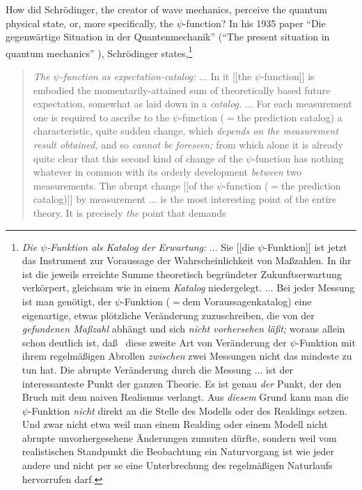 \documentclass [11pt]{llncs}
\begin{document}
\begin{description}
\label{l-schroe}
How did Schr\"odinger, the creator of wave mechanics, perceive
the quantum physical state, or, more specifically,  the
$\psi$-function? In his
1935 paper
``Die gegenw\"artige
Situation in der Quantenmechanik'' (``The present situation in quantum
mechanics''
\cite[p. 823]{schrodinger}), Schr\"odinger states,\footnote{
{\em Die $\psi$-Funktion als Katalog der Erwartung:}
$\ldots$
Sie [[die $\psi$-Funktion]] ist jetzt das Instrument zur Voraussage der
Wahrscheinlichkeit von Ma\ss zahlen. In ihr ist die jeweils erreichte
Summe theoretisch begr\"undeter Zukunftserwartung verk\"orpert,
gleichsam wie in einem {\em Katalog} niedergelegt.
$\ldots$
Bei jeder Messung ist man gen\"otigt, der $\psi$-Funktion ($=$dem
Voraussagenkatalog) eine eigenartige, etwas pl\"otzliche Ver\"anderung
zuzuschreiben, die von der {\em gefundenen Ma\ss zahl} abh\"angt und
sich {\em nicht vorhersehen l\"a\ss t;} woraus allein schon deutlich
ist, da\ss~ diese zweite Art von Ver\"anderung der $\psi$-Funktion mit
ihrem regelm\"a\ss igen Abrollen {\em zwischen} zwei Messungen nicht das
mindeste zu tun hat. Die abrupte Ver\"anderung durch die Messung
$\ldots$ ist der interessanteste Punkt der ganzen Theorie. Es ist genau
{\em der} Punkt, der den Bruch mit dem naiven Realismus verlangt. Aus
{\em diesem} Grund kann man die $\psi$-Funktion {\em nicht} direkt an
die Stelle des Modells oder des Realdings setzen. Und zwar nicht etwa
weil man einem Realding oder einem Modell nicht abrupte unvorhergesehene
\"Anderungen zumuten d\"urfte, sondern weil vom realistischen Standpunkt
die Beobachtung ein Naturvorgang ist wie jeder andere und nicht per se
eine Unterbrechung des regelm\"a\ss igen Naturlaufs hervorrufen darf.
}
\begin{quote}
{\em The $\psi$-function as expectation-catalog:}
$\ldots$
In it [[the $\psi$-function]] is embodied the momentarily-attained sum
of theoretically based future expectation, somewhat as laid down in a
{\em catalog.}
$\ldots$
For each measurement one is required to ascribe to the $\psi$-function
($=$the prediction catalog) a characteristic, quite sudden change,
which {\em depends on the measurement result obtained,} and so {\em
cannot be foreseen;} from which alone it is already quite clear
that this second kind of change of the $\psi$-function has nothing
whatever in common with its orderly development {\em between} two
measurements. The abrupt change [[of the $\psi$-function ($=$the
prediction catalog)]] by measurement $\ldots$ is the most interesting
point of the entire theory. It is precisely {\em the} point that demands

\end{quote}
\end{description}
\end{document}
